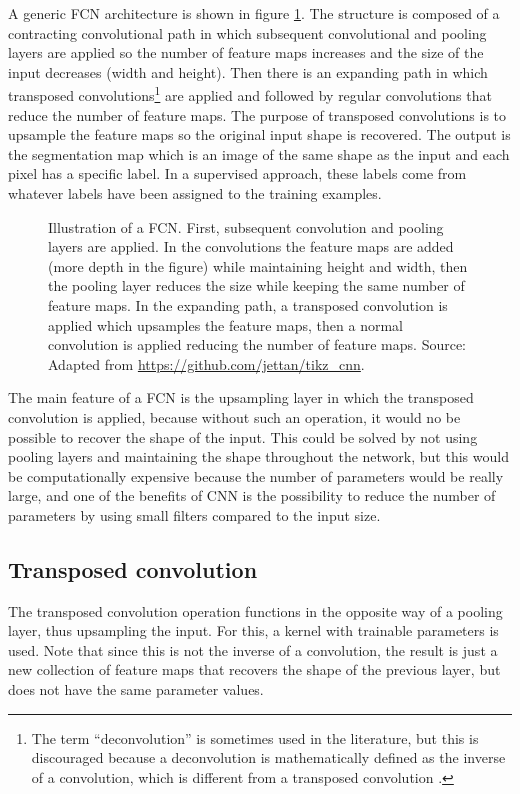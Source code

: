 A generic FCN architecture is shown in figure \ref{fig:fcn}. The structure is composed of a contracting convolutional path in which subsequent convolutional and pooling layers are applied so the number of feature maps increases and the size of the input decreases (width and height). Then there is an expanding path in which transposed convolutions\footnote{The term “deconvolution” is sometimes used in the literature, but this is discouraged because a deconvolution is mathematically defined as the inverse of a convolution, which is different from a transposed convolution \cite{trans-conv}.} are applied and followed by regular convolutions that reduce the number of feature maps. The purpose of transposed convolutions is to upsample the feature maps so the original input shape is recovered. The output is the segmentation map which is an image of the same shape as the input and each pixel has a specific label. In a supervised approach, these labels come from whatever labels have been assigned to the training examples. 

\begin{figure}
	\centering
	\noindent\resizebox{\textwidth}{!}{
	
	}
	\caption[Illustration of a fully convolutional network]{Illustration of a FCN. First, subsequent convolution and pooling layers are applied. In the convolutions the feature maps are added (more depth in the figure) while maintaining height and width, then the pooling layer reduces the size while keeping the same number of feature maps. In the expanding path, a transposed convolution is applied which upsamples the feature maps, then a normal convolution is applied reducing the number of feature maps. Source: Adapted from \url{https://github.com/jettan/tikz_cnn}.}
	\label{fig:fcn}
\end{figure}

The main feature of a FCN is the upsampling layer in which the transposed convolution is applied, because without such an operation, it would no be possible to recover the shape of the input. This could be solved by not using pooling layers and maintaining the shape throughout the network, but this would be computationally expensive because the number of parameters would be really large, and one of the benefits of CNN is the possibility to reduce the number of parameters by using small filters compared to the input size.

\subsection{Transposed convolution}
The transposed convolution operation functions in the opposite way of a pooling layer, thus upsampling the input. For this, a kernel with trainable parameters is used. Note that since this is not the inverse of a convolution, the result is just a new collection of feature maps that recovers the shape of the previous layer, but does not have the same parameter values.

